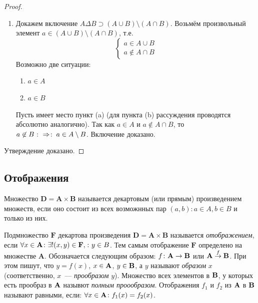 \begin{itemize}
\begin{proof}
\begin{enumerate}
      \item Докажем включение $A\Delta B \supset (A\cup B)\setminus (A\cap B)$. 
        Возьмём произвольный элемент $a\in (A\cup B)\setminus (A\cap B)$, т.е.
        $$
        \left\{
        \begin{array}{l}
          a\in A\cup B\\
          a\not\in A\cap B
        \end{array}
        \right.
        $$
    Возможно две ситуации:
    \begin{enumerate}
      \item $a\in A$
      \item $a\in B$
    \end{enumerate}
    
    Пусть имеет место пункт (a) (для пункта (b) рассуждения проводятся абсолютно аналогично). 
    Так как $a\in A$ и $a\not\in A\cap B$, то $a\not\in B\mathbin{\colon\Rightarrow \colon} a\in A\setminus B$. 
    Включение доказано.
    \end{enumerate}
    
    Утверждение доказано.
    \end{proof}	
\end{itemize}

\subsection{Отображения}

\begin{df}
Множество $\mathbf D=\mathbf A\times\mathbf B$ называется декартовым (или прямым) произве\-де\-ни\-ем множеств, если оно состоит из всех возможнных пар $(a,b)\colon a\in A,b\in B$ и только из них.
\end{df}

\begin{df}
 Подмножество $\mathbf F$ декартова произведения $\mathbf D =\mathbf A \times\mathbf B$ называется \emph{отобра\-же\-нием}, если $\forall x\in\mathbf A\colon\exists!(x,y)\in\mathbf F,\colon y\in B$. Тем самым отображение $\mathbf F$ определено на множестве $\mathbf A$. Обозначается следующим образом: $f\colon \mathbf{A}\to \mathbf{B}$ или $\mathbf{A}\stackrel{f}{\to}\mathbf{B}$. При этом
пишут, что $y=f(x)$, $x\in \mathbf{A}$, $y\in \mathbf{B}$, а $y$ называют \emph{образом} $x$ (соответственно,
$x$~--- \emph{прообразом} $y$). Множество всех элементов в $\mathbf{B}$, у которых есть прообраз в $\mathbf{A}$ назывют \emph{полным проообразом}. Отображения $f_1$ и $f_2$ из $\mathbf{A}$ в $\mathbf{B}$ называют равными,
если: $\forall x\in \mathbf{A}\colon f_1(x)=f_2(x)$.
 
\end{df}

